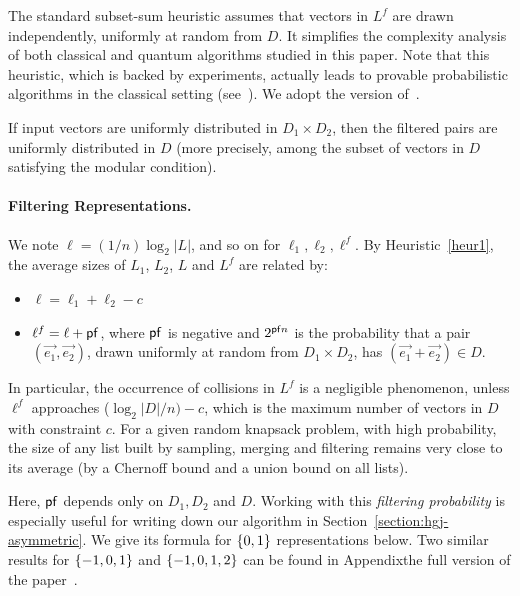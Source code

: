 The standard subset-sum heuristic assumes that vectors in $L^f$ are drawn independently, uniformly at random from $D$. It simplifies the complexity analysis of both classical and quantum algorithms studied in this paper. Note that this heuristic, which is backed by experiments, actually leads to provable probabilistic algorithms in the classical setting (see~\cite[Theorem 2]{DBLP:conf/eurocrypt/BeckerCJ11}). We adopt the version of~\cite{DBLP:conf/tqc/HelmM18}.

\begin{heuristic}
\label{heur1}
If input vectors are uniformly distributed in $D_1 \times D_2$, then the filtered pairs are uniformly distributed in $D$ (more precisely, among the subset of vectors in $D$ satisfying the modular condition).
\end{heuristic}

\paragraph{Filtering Representations.} We note $\ell = (1/n)\log_2|L|$, and so on for $\ell_1, \ell_2, \ell^f$.
By Heuristic~\ref{heur1}, the average sizes of $L_1$, $L_2$, $L$ and $L^f$ are related by:
\begin{itemize}
\item $\ell = \ell_1 + \ell_2 - c$
\item $\ell^f = \ell + \mathsf{pf}$, where $\mathsf{pf}$ is negative and $2^{\mathsf{pf} n}$ is the probability that a pair $(\vec{e_1}, \vec{e_2})$, drawn uniformly at random from $D_1 \times D_2$, has $(\vec{e_1} + \vec{e_2}) \in D$.
\end{itemize}
In particular, the occurrence of collisions in $L^f$ is a negligible phenomenon, unless $\ell^f$ approaches ($\log_2 |D| / n) - c$, which is the maximum number of vectors in $D$ with constraint $c$. For a given random knapsack problem, with high probability, the size of any list built by sampling, merging and filtering remains very close to its average (by a Chernoff bound and a union bound on all lists).

Here, $\mathsf{pf}$ depends only on $D_1, D_2$ and $D$. Working with this \emph{filtering probability} is especially useful for writing down our algorithm in Section~\ref{section:hgj-asymmetric}. We give its formula for $\{0,1\}$ representations below. Two similar results for $\{-1,0,1\}$ and $\{-1,0,1,2\}$ can be found in \ifeprint Appendix\else the full version of the paper~\cite{DBLP:journals/iacr/BonnetainBSS20}\fi.



